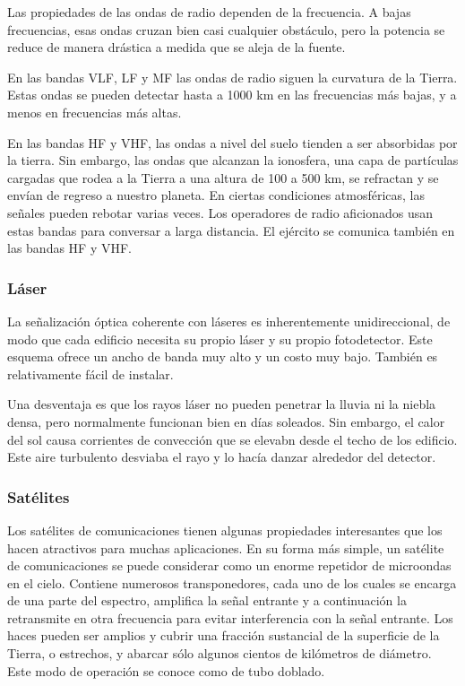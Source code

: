 Las propiedades de las ondas de radio dependen de la frecuencia. A bajas frecuencias, esas ondas cruzan bien casi cualquier obstáculo, pero la potencia se reduce de manera drástica a medida que se aleja de la fuente.

En las bandas VLF, LF y MF las ondas de radio siguen la curvatura de la Tierra. Estas ondas se pueden detectar hasta a 1000 km en las frecuencias más bajas, y a menos en frecuencias más altas.

En las bandas HF y VHF, las ondas a nivel del suelo tienden a ser absorbidas por la tierra. Sin
embargo, las ondas que alcanzan la ionosfera, una capa de partículas cargadas que rodea a la Tierra a una altura de 100 a 500 km, se refractan y se envían de regreso a nuestro planeta. En ciertas condiciones atmosféricas, las señales pueden rebotar varias veces. Los operadores de radio aficionados usan estas bandas para conversar a larga distancia.
El ejército se comunica también en las bandas HF y VHF.

\subsubsection*{Láser}
La señalización óptica coherente con láseres es inherentemente unidireccional, de modo que cada edificio necesita su propio láser y su propio fotodetector. Este esquema ofrece un ancho de banda muy alto y un costo muy bajo. También es relativamente fácil de instalar.

Una desventaja es que los rayos láser no pueden penetrar la lluvia ni la niebla densa, pero normalmente funcionan bien en días soleados. Sin embargo, el calor del sol causa corrientes de convección que se elevabn desde el techo de los edificio. Este aire turbulento desviaba el rayo y lo hacía danzar alrededor del detector.

\subsubsection*{Satélites}
Los satélites de comunicaciones tienen algunas propiedades interesantes que los hacen atractivos para muchas aplicaciones. En su forma más simple, un satélite de comunicaciones se puede
considerar como un enorme repetidor de microondas en el cielo. Contiene numerosos transponedores, cada uno de los cuales se encarga de una parte del espectro, amplifica la señal entrante
y a continuación la retransmite en otra frecuencia para evitar interferencia con la señal entrante.
Los haces pueden ser amplios y cubrir una fracción sustancial de la superficie de la Tierra, o estrechos, y abarcar sólo algunos cientos de kilómetros de diámetro. Este modo de operación se
conoce como de tubo doblado.

